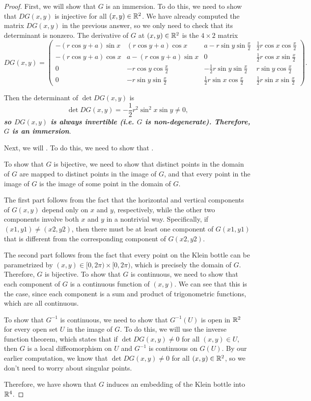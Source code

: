 \begin{proof}
First, we will show that $G$ is an immersion. To do this, we need to show that $DG(x,y)$ is injective for all $(x,y) \in {\mathbb R}^2$. We have already computed the matrix $DG(x,y)$ in the previous answer, so we only need to check that its determinant is nonzero. The derivative of $G$ at $(x,y)\in {\mathbb R}^2$ is the $4\times 2$ matrix 
$$
DG(x,y) = \begin{pmatrix}
-(r\cos y +a) \sin x & (r\cos y+a)\cos x &a-r\sin y \sin \frac{x}{2} & \frac{1}{2}r\cos x\cos \frac{x}{2}\\
-(r\cos y +a) \cos x &a-(r\cos y+a)\sin x & 0 & \frac{1}{2}r\cos x\sin \frac{x}{2}\\
0 & -r\cos y \cos \frac{x}{2} & -\frac{1}{2}r\sin y\sin \frac{x}{2} & r\sin y\cos \frac{x}{2}\\
0 &-r\sin y\sin \frac{x}{2} & \frac{1}{2}r\sin x\cos \frac{x}{2} & \frac{1}{2}r\sin x\sin \frac{x}{2}
\end{pmatrix}.
$$

Then the determinant of $\det DG(x,y)$ is 
$$
\det DG(x,y) = -\frac{1}{2}r^2\sin^2 x\sin y \neq 0,
$$
\textit{\textbf{ so $DG(x,y)$ is always invertible (i.e. $G$ is non-degenerate). Therefore,  $G$ is an immersion}}.

Next, we will . To do this, we need to show that .

To show that $G$ is bijective, we need to show that distinct points in the domain of $G$ are mapped to distinct points in the image of $G$, and that every point in the image of $G$ is the image of some point in the domain of $G$. 

The first part follows from the fact that the horizontal and vertical components of $G(x,y)$ depend only on $x$ and $y$, respectively, while the other two components involve both $x$ and $y$ in a nontrivial way. Specifically, if $(x1,y1) \neq (x2,y2)$, then there must be at least one component of $G(x1,y1)$ that is different from the corresponding component of $G(x2,y2)$.

The second part follows from the fact that every point on the Klein bottle can be parametrized by $(x,y) \in [0,2\pi) \times [0,2\pi)$, which is precisely the domain of $G$. Therefore, $G$ is bijective.
To show that $G$ is continuous, we need to show that each component of $G$ is a continuous function of $(x,y)$. We can see that this is the case, since each component is a sum and product of trigonometric functions, which are all continuous.

To show that $G^{-1}$ is continuous, we need to show that $G^{-1}(U)$ is open in ${\mathbb R}^2$ for every open set $U$ in the image of $G$. To do this, we will use the inverse function theorem, which states that if $\det DG(x,y) \neq 0$ for all $(x,y) \in U$, then $G$ is a local diffeomorphism on $U$ and $G^{-1}$ is continuous on $G(U)$. By our earlier computation, we know that $\det DG(x,y) \neq 0$ for all $(x,y) \in {\mathbb R}^2$, so we don't need to worry about singular points.

Therefore, we have shown that $G$ induces an embedding of the Klein bottle into ${\mathbb R}^4$.
\end{proof}
